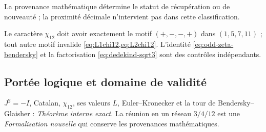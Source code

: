 La provenance mathématique détermine le statut de récupération ou de
nouveauté ; la proximité décimale n'intervient pas dans cette classification.

\begin{remark}
Le caractère \(\chi_{12}\) doit avoir exactement le motif
\((+,-,-,+)\) dans \((1,5,7,11)\) ; tout autre motif invalide
\cref{eq:L1chi12,eq:L2chi12}. L'identité
\cref{eq:odd-zeta-bendersky} et la factorisation
\cref{eq:dedekind-sqrt3} sont des contrôles indépendants.
\end{remark}

\subsection*{Portée logique et domaine de validité}
\(J^2=-I\), Catalan, \(\chi_{12}\), ses valeurs \(L\), Euler--Kronecker et la tour de Bendersky--Glaisher : \emph{Théorème interne exact}. La réunion en un réseau \(3/4/12\) est une \emph{Formalisation nouvelle} qui conserve les provenances mathématiques.

